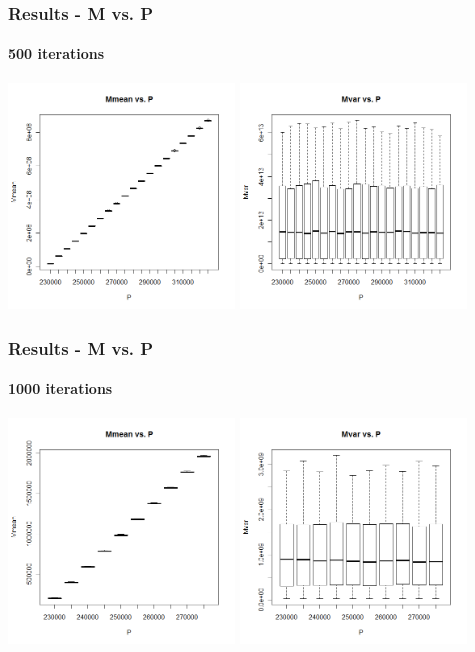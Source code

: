 \begin{frame}
    \frametitle{Results - M vs. P }
	\framesubtitle{500 iterations}
\hspace*{-5mm}
\includegraphics[height=6cm]{boxplot500_mmean_P}
\includegraphics[height=6cm]{boxplot500_mvar_P}
\end{frame}


\begin{frame}
    \frametitle{Results - M vs. P }
	\framesubtitle{1000 iterations}
\hspace*{-5mm}
\includegraphics[height=6cm]{boxplot1000_mmean_P}
\includegraphics[height=6cm]{boxplot1000_mvar_P}
\end{frame}


